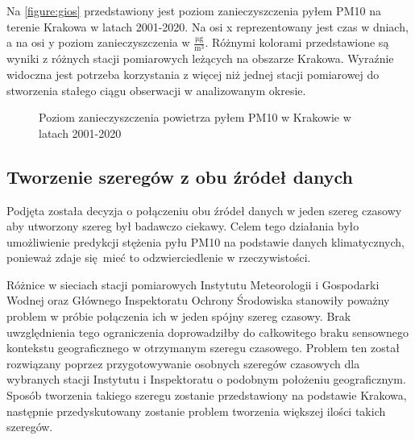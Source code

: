 \documentclass[10pt,a4paper]{article}
\begin{document}
Na \autoref{figure:gios} przedstawiony jest poziom zanieczyszczenia pyłem PM10 na terenie Krakowa w latach 2001-2020. Na osi x reprezentowany jest czas w dniach, a na osi y poziom zanieczyszczenia w $\frac{\si{\micro\gram}}{\si\meter^3}$. Różnymi kolorami przedstawione są wyniki z różnych stacji pomiarowych leżących na obszarze Krakowa. Wyraźnie widoczna jest potrzeba korzystania z więcej niż jednej stacji pomiarowej do stworzenia stałego ciągu obserwacji w analizowanym okresie. 
\begin{figure}[!ht]
	\centering
	\caption{Poziom zanieczyszczenia powietrza pyłem PM10 w Krakowie w latach 2001-2020}
	\label{figure:gios}
\end{figure}
\FloatBarrier

\subsection{Tworzenie szeregów z obu źródeł danych}
Podjęta została decyzja o połączeniu obu źródeł danych w jeden szereg czasowy aby utworzony szereg był badawczo ciekawy. Celem tego działania było umożliwienie predykcji stężenia pyłu PM10 na podstawie danych klimatycznych, ponieważ zdaje się mieć to odzwierciedlenie w rzeczywistości.

Różnice w sieciach stacji pomiarowych Instytutu Meteorologii i Gospodarki Wodnej oraz Głównego Inspektoratu Ochrony Środowiska stanowiły poważny problem w próbie połączenia ich w jeden spójny szereg czasowy. Brak uwzględnienia tego ograniczenia doprowadziłby do całkowitego braku sensownego kontekstu geograficznego w otrzymanym szeregu czasowego. Problem ten został rozwiązany poprzez przygotowywanie osobnych szeregów czasowych dla wybranych stacji Instytutu i Inspektoratu o podobnym położeniu geograficznym. Sposób tworzenia takiego szeregu zostanie przedstawiony na podstawie Krakowa, następnie przedyskutowany zostanie problem tworzenia większej ilości takich szeregów. 
\end{document}
